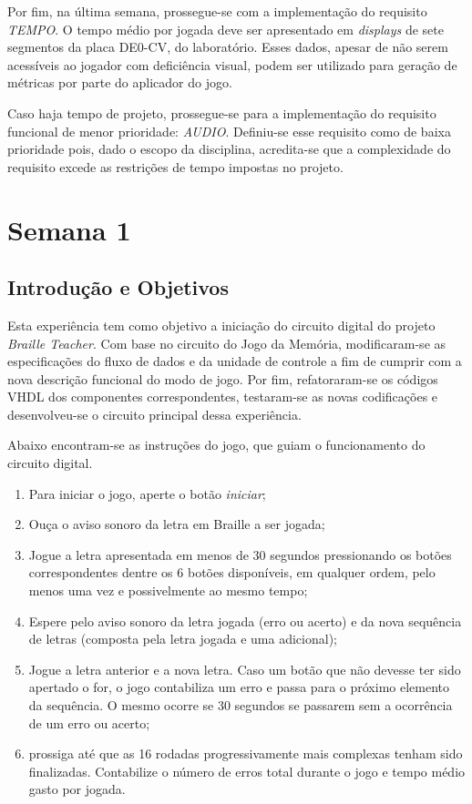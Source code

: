 \documentclass[amsmath,amssymb,floatfix]{report}
\begin{document}
Por fim, na última semana, prossegue-se com a implementação do requisito \textit{TEMPO}. O tempo médio por jogada deve ser apresentado em \textit{displays} de sete segmentos da placa DE0-CV, do laboratório. Esses dados, apesar de não serem acessíveis ao jogador com deficiência visual, podem ser utilizado para geração de métricas por parte do aplicador do jogo.

Caso haja tempo de projeto, prossegue-se para a implementação do requisito funcional de menor prioridade: \textit{AUDIO}. Definiu-se esse requisito como de baixa prioridade pois, dado o escopo da disciplina, acredita-se que a complexidade do requisito excede as restrições de tempo impostas no projeto.  

\chapter{Semana 1}
\label{chap:semana1}

 \section{Introdução e Objetivos}
 \label{sec:introEObjetivos1}
 
Esta experiência tem como objetivo a iniciação do circuito digital do projeto \textit{Braille Teacher}. Com base no circuito do Jogo da Memória, modificaram-se as especificações do fluxo de dados e da unidade de controle a fim de cumprir com a nova descrição funcional do modo de jogo. Por fim, refatoraram-se os códigos VHDL dos componentes correspondentes, testaram-se as novas codificações e desenvolveu-se o circuito principal dessa experiência.

Abaixo encontram-se as instruções do jogo, que guiam o funcionamento do circuito digital.

\begin{enumerate}
    \item Para iniciar o jogo, aperte o botão \textit{iniciar};
    \item Ouça o aviso sonoro da letra em Braille a ser jogada;
    \item Jogue a letra apresentada em menos de 30 segundos pressionando os botões correspondentes dentre os 6 botões disponíveis, em qualquer ordem, pelo menos uma vez e possivelmente ao mesmo tempo;
    \item Espere pelo aviso sonoro da letra jogada (erro ou acerto) e da nova sequência de letras (composta pela letra jogada e uma adicional);
    \item Jogue a letra anterior e a nova letra. Caso um botão que não devesse ter sido apertado o for, o jogo contabiliza um erro e passa para o próximo elemento da sequência. O mesmo ocorre se 30 segundos se passarem sem a ocorrência de um erro ou acerto;
    \item prossiga até que as 16 rodadas progressivamente mais complexas tenham sido finalizadas. Contabilize o número de erros total durante o jogo e tempo médio gasto por jogada.
\end{enumerate}
\end{document}

